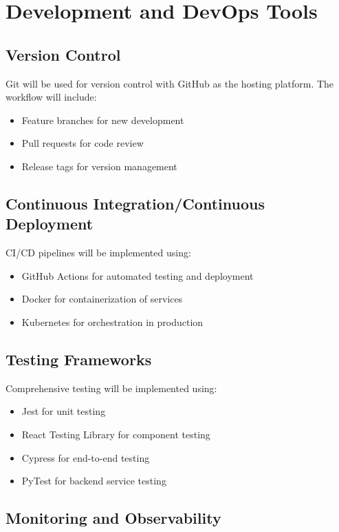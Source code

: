 \documentclass[12pt,a4paper]{report}
\begin{document}
\section*{Development and DevOps Tools}

\subsection*{Version Control}

Git will be used for version control with GitHub as the hosting platform. The workflow will include:
\begin{itemize}
    \item Feature branches for new development
    \item Pull requests for code review
    \item Release tags for version management
\end{itemize}

\subsection*{Continuous Integration/Continuous Deployment}

CI/CD pipelines will be implemented using:
\begin{itemize}
    \item GitHub Actions for automated testing and deployment
    \item Docker for containerization of services
    \item Kubernetes for orchestration in production
\end{itemize}

\subsection*{Testing Frameworks}

Comprehensive testing will be implemented using:
\begin{itemize}
    \item Jest for unit testing
    \item React Testing Library for component testing
    \item Cypress for end-to-end testing
    \item PyTest for backend service testing
\end{itemize}

\subsection*{Monitoring and Observability}
\end{document}
